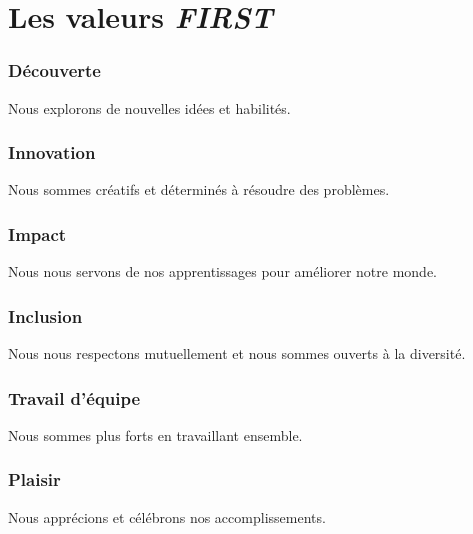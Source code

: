 \documentclass[12pt]{report}
\begin{document}
{\hypersetup{hidelinks}
%
\clearpage
{}
\setcounter{page}{1}

\tableofcontents

\newpage
%
\newpage
%
\listoffigures
{}
\newpage
%
\chapter*{Les valeurs \textit{FIRST}}

\subsection*{Découverte}
Nous explorons de nouvelles idées et habilités.

\subsection*{Innovation}
Nous sommes créatifs et déterminés à résoudre des problèmes.

\subsection*{Impact}
Nous nous servons de nos apprentissages pour améliorer notre monde.

\subsection*{Inclusion}
Nous nous respectons mutuellement et nous sommes ouverts à la diversité.

\subsection*{Travail d'équipe}
Nous sommes plus forts en travaillant ensemble.

\subsection*{Plaisir}
Nous apprécions et célébrons nos accomplissements.

\newpage

%
\linespread{1.5}
\normalsize
{}
\setcounter{page}{1}
} %
\end{document}
